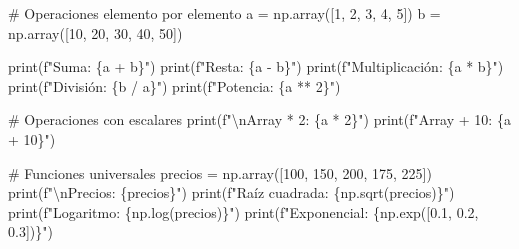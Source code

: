 \documentclass[
  doc,
  floatsintext,
  longtable,
  a4paper,
  nolmodern,
  notxfonts,
  notimes,
  12pt,
  colorlinks=true,linkcolor=blue,citecolor=blue,urlcolor=blue]{apa7}
\newenvironment{Shaded}{\begin{snugshade}}{\end{snugshade}}
\newcommand{\BuiltInTok}[1]{\textcolor[rgb]{0.00,0.23,0.31}{#1}}
\newcommand{\CharTok}[1]{\textcolor[rgb]{0.13,0.47,0.30}{#1}}
\newcommand{\CommentTok}[1]{\textcolor[rgb]{0.37,0.37,0.37}{#1}}
\newcommand{\DecValTok}[1]{\textcolor[rgb]{0.68,0.00,0.00}{#1}}
\newcommand{\FloatTok}[1]{\textcolor[rgb]{0.68,0.00,0.00}{#1}}
\newcommand{\NormalTok}[1]{\textcolor[rgb]{0.00,0.23,0.31}{#1}}
\newcommand{\OperatorTok}[1]{\textcolor[rgb]{0.37,0.37,0.37}{#1}}
\newcommand{\SpecialCharTok}[1]{\textcolor[rgb]{0.37,0.37,0.37}{#1}}
\newcommand{\SpecialStringTok}[1]{\textcolor[rgb]{0.13,0.47,0.30}{#1}}
\begin{document}
\begin{Shaded}
\begin{Highlighting}[]
\CommentTok{\# Operaciones elemento por elemento}
\NormalTok{a }\OperatorTok{=}\NormalTok{ np.array([}\DecValTok{1}\NormalTok{, }\DecValTok{2}\NormalTok{, }\DecValTok{3}\NormalTok{, }\DecValTok{4}\NormalTok{, }\DecValTok{5}\NormalTok{])}
\NormalTok{b }\OperatorTok{=}\NormalTok{ np.array([}\DecValTok{10}\NormalTok{, }\DecValTok{20}\NormalTok{, }\DecValTok{30}\NormalTok{, }\DecValTok{40}\NormalTok{, }\DecValTok{50}\NormalTok{])}

\BuiltInTok{print}\NormalTok{(}\SpecialStringTok{f"Suma: }\SpecialCharTok{\{}\NormalTok{a }\OperatorTok{+}\NormalTok{ b}\SpecialCharTok{\}}\SpecialStringTok{"}\NormalTok{)}
\BuiltInTok{print}\NormalTok{(}\SpecialStringTok{f"Resta: }\SpecialCharTok{\{}\NormalTok{a }\OperatorTok{{-}}\NormalTok{ b}\SpecialCharTok{\}}\SpecialStringTok{"}\NormalTok{)}
\BuiltInTok{print}\NormalTok{(}\SpecialStringTok{f"Multiplicación: }\SpecialCharTok{\{}\NormalTok{a }\OperatorTok{*}\NormalTok{ b}\SpecialCharTok{\}}\SpecialStringTok{"}\NormalTok{)}
\BuiltInTok{print}\NormalTok{(}\SpecialStringTok{f"División: }\SpecialCharTok{\{}\NormalTok{b }\OperatorTok{/}\NormalTok{ a}\SpecialCharTok{\}}\SpecialStringTok{"}\NormalTok{)}
\BuiltInTok{print}\NormalTok{(}\SpecialStringTok{f"Potencia: }\SpecialCharTok{\{}\NormalTok{a }\OperatorTok{**} \DecValTok{2}\SpecialCharTok{\}}\SpecialStringTok{"}\NormalTok{)}

\CommentTok{\# Operaciones con escalares}
\BuiltInTok{print}\NormalTok{(}\SpecialStringTok{f"}\CharTok{\textbackslash{}n}\SpecialStringTok{Array * 2: }\SpecialCharTok{\{}\NormalTok{a }\OperatorTok{*} \DecValTok{2}\SpecialCharTok{\}}\SpecialStringTok{"}\NormalTok{)}
\BuiltInTok{print}\NormalTok{(}\SpecialStringTok{f"Array + 10: }\SpecialCharTok{\{}\NormalTok{a }\OperatorTok{+} \DecValTok{10}\SpecialCharTok{\}}\SpecialStringTok{"}\NormalTok{)}

\CommentTok{\# Funciones universales}
\NormalTok{precios }\OperatorTok{=}\NormalTok{ np.array([}\DecValTok{100}\NormalTok{, }\DecValTok{150}\NormalTok{, }\DecValTok{200}\NormalTok{, }\DecValTok{175}\NormalTok{, }\DecValTok{225}\NormalTok{])}
\BuiltInTok{print}\NormalTok{(}\SpecialStringTok{f"}\CharTok{\textbackslash{}n}\SpecialStringTok{Precios: }\SpecialCharTok{\{}\NormalTok{precios}\SpecialCharTok{\}}\SpecialStringTok{"}\NormalTok{)}
\BuiltInTok{print}\NormalTok{(}\SpecialStringTok{f"Raíz cuadrada: }\SpecialCharTok{\{}\NormalTok{np}\SpecialCharTok{.}\NormalTok{sqrt(precios)}\SpecialCharTok{\}}\SpecialStringTok{"}\NormalTok{)}
\BuiltInTok{print}\NormalTok{(}\SpecialStringTok{f"Logaritmo: }\SpecialCharTok{\{}\NormalTok{np}\SpecialCharTok{.}\NormalTok{log(precios)}\SpecialCharTok{\}}\SpecialStringTok{"}\NormalTok{)}
\BuiltInTok{print}\NormalTok{(}\SpecialStringTok{f"Exponencial: }\SpecialCharTok{\{}\NormalTok{np}\SpecialCharTok{.}\NormalTok{exp([}\FloatTok{0.1}\NormalTok{, }\FloatTok{0.2}\NormalTok{, }\FloatTok{0.3}\NormalTok{])}\SpecialCharTok{\}}\SpecialStringTok{"}\NormalTok{)}
\end{Highlighting}
\end{Shaded}
\end{document}
